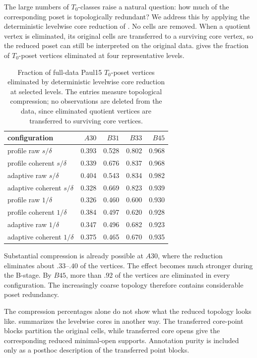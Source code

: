 \documentclass[a4paper,11pt]{article}
\theoremstyle{definition}
\theoremstyle{remark}
\begin{document}
The large numbers of $T_0$-classes raise a natural question: how much of the corresponding poset is topologically redundant? We address this by applying the deterministic levelwise core reduction of . No cells are removed. When a quotient vertex is eliminated, its original cells are transferred to a surviving core vertex, so the reduced poset can still be interpreted on the original data.  gives the fraction of $T_0$-poset vertices eliminated at four representative levels.

\begin{table}[!ht]
\centering
\small
\caption{Fraction of full-data Paul15 $T_0$-poset vertices eliminated by deterministic levelwise core reduction at selected levels. The entries measure topological compression; no observations are deleted from the data, since eliminated quotient vertices are transferred to surviving core vertices.}
\label{tab:paul15-core-compression}
\begin{tabular}{@{}lrrrr@{}}
\toprule
configuration & $A30$ & $B31$ & $B33$ & $B45$ \\
\midrule
profile raw $s/\delta$ & 0.393 & 0.528 & 0.802 & 0.968 \\
profile coherent $s/\delta$ & 0.339 & 0.676 & 0.837 & 0.968 \\
adaptive raw $s/\delta$ & 0.404 & 0.543 & 0.834 & 0.982 \\
adaptive coherent $s/\delta$ & 0.328 & 0.669 & 0.823 & 0.939 \\
profile raw $1/\delta$ & 0.326 & 0.460 & 0.600 & 0.930 \\
profile coherent $1/\delta$ & 0.384 & 0.497 & 0.620 & 0.928 \\
adaptive raw $1/\delta$ & 0.347 & 0.496 & 0.682 & 0.923 \\
adaptive coherent $1/\delta$ & 0.375 & 0.465 & 0.670 & 0.935 \\
\bottomrule
\end{tabular}
\end{table}

Substantial compression is already possible at $A30$, where the reduction eliminates about $.33$–$.40$ of the vertices. The effect becomes much stronger during the B-stage. By $B45$, more than $.92$ of the vertices are eliminated in every configuration. The increasingly coarse topology therefore contains considerable poset redundancy.

The compression percentages alone do not show what the reduced topology looks like.  summarizes the levelwise cores in another way. The transferred core-point blocks partition the original cells, while transferred core opens give the corresponding reduced minimal-open supports. Annotation purity is included only as a posthoc description of the transferred point blocks.
\end{document}
